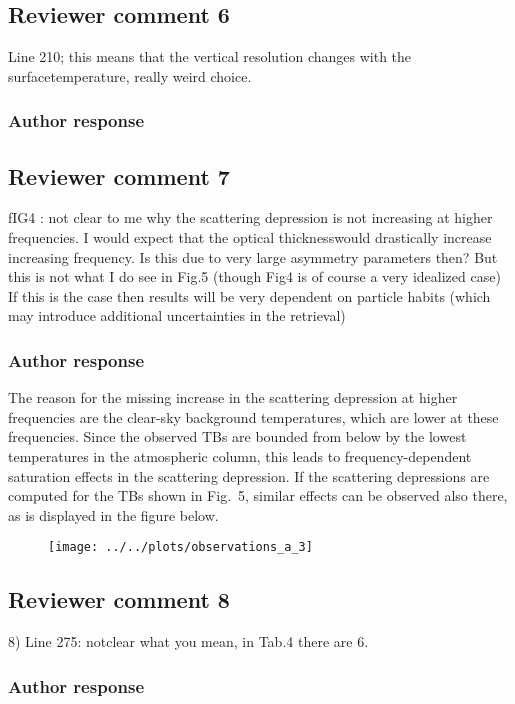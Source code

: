 \documentclass[11pt]{scrartcl}
\begin{document}
\subsection*{Reviewer comment 6}
Line 210; this means that the vertical resolution changes with the surfacetemperature, really weird choice.

\subsubsection*{Author response}

\subsection*{Reviewer comment 7}
fIG4 : not clear to me why the scattering depression is not increasing at
higher frequencies. I would expect that the optical thicknesswould drastically
increase increasing frequency. Is this due to very large asymmetry parameters
then? But this is not what I do see in Fig.5 (though Fig4 is of course a very
idealized case) If this is the case then results will be very dependent on
particle habits (which may introduce additional uncertainties in the retrieval)

\subsubsection*{Author response}

The reason for the missing increase in the scattering depression at higher
frequencies are the clear-sky background temperatures, which are lower at these
frequencies. Since the observed TBs are bounded from below by the lowest temperatures
in the atmospheric column, this leads to frequency-dependent saturation effects
in the scattering depression. If the scattering depressions are computed for the
TBs shown in Fig.~5, similar effects can be observed also there, as is displayed
in the figure below.

\begin{figure}[!hbpt]
  \centering
  \texttt{[image: ../../plots/observations\_a\_3]}
\end{figure}

\subsection*{Reviewer comment 8}
8) Line 275: notclear what you mean, in Tab.4 there are 6. 

\subsubsection*{Author response}
\end{document}
